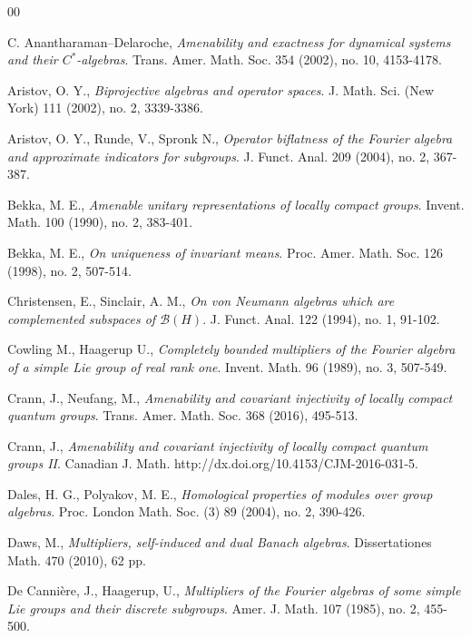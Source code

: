 \documentclass[preprint,12pt]{elsarticle}
\newcommand{\mc}[1]{\mathcal{#1}}
\newcommand{\e}[1]{\emph{#1}}
\newcommand{\BH}{\mc{B}(H)}
\begin{document}
\begin{thebibliography}{00}

 C. Anantharaman--Delaroche,
\textit{Amenability and exactness for dynamical systems and their $C^*$-algebras}.
Trans. Amer. Math. Soc. 354 (2002), no. 10, 4153-4178.

 Aristov, O. Y.,
\e{Biprojective algebras and operator spaces}.
J. Math. Sci. (New York) 111 (2002), no. 2, 3339-3386.

 Aristov, O. Y., Runde, V., Spronk N.,
\e{Operator biflatness of the Fourier algebra and approximate indicators for subgroups}.
J. Funct. Anal. 209 (2004), no. 2, 367-387.


 Bekka, M. E.,
\e{Amenable unitary representations of locally compact groups}.
Invent. Math. 100 (1990), no. 2, 383-401.

 Bekka, M. E.,
\e{On uniqueness of invariant means}.
Proc. Amer. Math. Soc. 126 (1998), no. 2, 507-514.


 Christensen, E., Sinclair, A. M.,
\e{On von Neumann algebras which are complemented subspaces of $\BH$}.
 J. Funct. Anal. 122 (1994), no. 1, 91-102.


 Cowling M., Haagerup U.,
\e{Completely bounded multipliers of the Fourier algebra of a simple Lie group of real rank one}.
Invent. Math. 96 (1989), no. 3, 507-549.

 Crann, J., Neufang, M.,
\e{Amenability and covariant injectivity of locally compact quantum groups}.
Trans. Amer. Math. Soc. 368 (2016), 495-513.

 Crann, J.,
\e{Amenability and covariant injectivity of locally compact quantum groups II}.
Canadian J. Math. http://dx.doi.org/10.4153/CJM-2016-031-5.
 

 Dales, H. G., Polyakov, M. E.,
\e{Homological properties of modules over group algebras}.
Proc. London Math. Soc. (3) 89 (2004), no. 2, 390-426.


 Daws, M.,
\e{Multipliers, self-induced and dual Banach algebras}.
Dissertationes Math. 470 (2010), 62 pp.


 De Canni\`{e}re, J., Haagerup, U.,
\e{Multipliers of the Fourier algebras of some simple Lie groups and their discrete subgroups}.
Amer. J. Math. 107 (1985), no. 2, 455-500.



\end{thebibliography}
\end{document}
